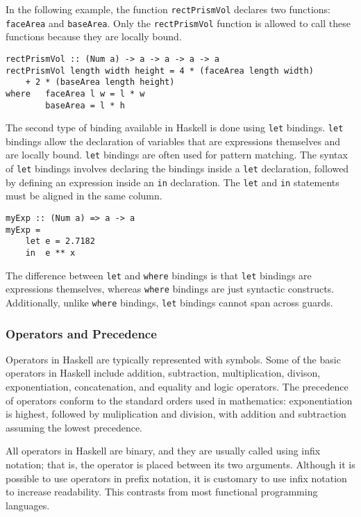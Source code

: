 \documentclass[titlepage,12pt]{article}
\begin{document}
In the following example, the function \texttt{rectPrismVol} declares two functions: \texttt{faceArea} and \texttt{baseArea}. Only the 
\texttt{rectPrismVol} function is allowed to call these functions because they are locally bound. 

\begin{verbatim}
rectPrismVol :: (Num a) -> a -> a -> a -> a
rectPrismVol length width height = 4 * (faceArea length width)
    + 2 * (baseArea length height)
where   faceArea l w = l * w
        baseArea = l * h
\end{verbatim}

The second type of binding available in Haskell is done using \texttt{let} bindings. \texttt{let} bindings allow the declaration of 
variables that are expressions themselves and are locally bound.  \texttt{let} bindings are often used for pattern matching. 
The syntax of \texttt{let} bindings involves declaring the bindings inside a \texttt{let} declaration, followed by defining an 
expression inside an \texttt{in} declaration. The \texttt{let} and \texttt{in} statements must be aligned in the same column. 

\begin{verbatim}
myExp :: (Num a) => a -> a
myExp =
    let e = 2.7182
    in  e ** x
\end{verbatim}

The difference between \texttt{let} and \texttt{where} bindings is that \texttt{let} bindings are expressions themselves, whereas 
\texttt{where} bindings are just syntactic constructs. Additionally, unlike \texttt{where} bindings, \texttt{let} bindings cannot 
span across guards.

\subsubsection{Operators and Precedence}

Operators in Haskell are typically represented with symbols. Some of the basic operators in Haskell include addition, 
subtraction, multiplication, divison, exponentiation, concatenation, and equality and logic operators. The 
precedence of operators conform to the standard orders used in mathematics: exponentiation is highest, followed by 
muliplication and division, with addition and subtraction assuming the lowest precedence.  

All operators in Haskell are binary, and they are usually called using infix notation; that is, the operator is 
placed between its two arguments. Although it is possible to use operators in prefix notation, it is customary to use 
infix notation to increase readability. This contrasts from most functional programming languages. 
\end{document}
